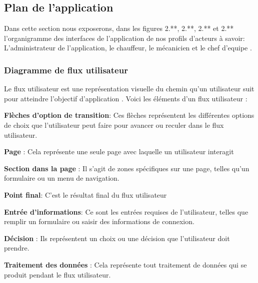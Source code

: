 
\newpage
\subsection{Plan de l'application}
    Dans cette section nous exposerons, dans les figures 2.**, 2.**, 2.** et 2.** l'organigramme des interfaces de l'application de nos profils d'acteurs à savoir: L'administrateur de l'application, le chauffeur, le mécanicien  et le chef d'equipe .\\
    
\subsubsection{Diagramme de flux utilisateur}
Le flux utilisateur est une représentation visuelle du chemin qu'un utilisateur suit pour atteindre l’objectif d’application . Voici les éléments d'un flux utilisateur : \\

\item[$\bullet$]\textbf {Flèches d'option de transition}: Ces flèches représentent les différentes options de choix que l'utilisateur peut faire pour avancer ou reculer dans le flux utilisateur.

\item[$\bullet$]\textbf {Page }: Cela représente une seule page  avec laquelle un utilisateur interagit

\item[$\bullet$]\textbf {Section dans la page} : Il s'agit de zones spécifiques sur une page, telles qu'un formulaire ou un menu de navigation.

\item[$\bullet$]\textbf {Point final}: C'est le résultat final du flux utilisateur

\item[$\bullet$]\textbf {Entrée d'informations}: Ce sont les entrées requises de l'utilisateur, telles que remplir un formulaire ou saisir des informations de connexion.

\item[$\bullet$]\textbf {Décision } : Ils représentent un choix ou une décision que l'utilisateur doit prendre.

\item[$\bullet$]\textbf {Traitement des données} : Cela représente tout traitement de données qui se produit pendant le flux utilisateur.\\
\\

